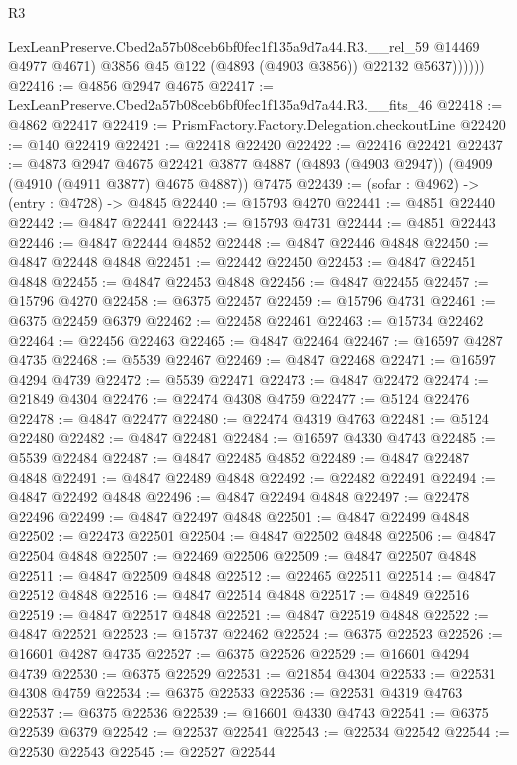 \begin{lexlean}{R3}
\begin{coremodule}
                LexLeanPreserve.Cbed2a57b08ceb6bf0fec1f135a9d7a44.R3.__rel_59 @14469 @4977 @4671)
                @3856
                @45
                @122
                (@4893 (@4903 @3856))
                @22132
                @5637))))))
@22416 := @4856 @2947 @4675
@22417 := LexLeanPreserve.Cbed2a57b08ceb6bf0fec1f135a9d7a44.R3.__fits_46
@22418 := @4862 @22417
@22419 := PrismFactory.Factory.Delegation.checkoutLine
@22420 := @140 @22419
@22421 := @22418 @22420
@22422 := @22416 @22421
@22437 := @4873
    @2947
    @4675
    @22421
    @3877
    @4887
    (@4893 (@4903 @2947))
    (@4909 (@4910 (@4911 @3877) @4675 @4887))
    @7475
@22439 := (sofar : @4962) -> (entry : @4728) -> @4845
@22440 := @15793 @4270
@22441 := @4851 @22440
@22442 := @4847 @22441
@22443 := @15793 @4731
@22444 := @4851 @22443
@22446 := @4847 @22444 @4852
@22448 := @4847 @22446 @4848
@22450 := @4847 @22448 @4848
@22451 := @22442 @22450
@22453 := @4847 @22451 @4848
@22455 := @4847 @22453 @4848
@22456 := @4847 @22455
@22457 := @15796 @4270
@22458 := @6375 @22457
@22459 := @15796 @4731
@22461 := @6375 @22459 @6379
@22462 := @22458 @22461
@22463 := @15734 @22462
@22464 := @22456 @22463
@22465 := @4847 @22464
@22467 := @16597 @4287 @4735
@22468 := @5539 @22467
@22469 := @4847 @22468
@22471 := @16597 @4294 @4739
@22472 := @5539 @22471
@22473 := @4847 @22472
@22474 := @21849 @4304
@22476 := @22474 @4308 @4759
@22477 := @5124 @22476
@22478 := @4847 @22477
@22480 := @22474 @4319 @4763
@22481 := @5124 @22480
@22482 := @4847 @22481
@22484 := @16597 @4330 @4743
@22485 := @5539 @22484
@22487 := @4847 @22485 @4852
@22489 := @4847 @22487 @4848
@22491 := @4847 @22489 @4848
@22492 := @22482 @22491
@22494 := @4847 @22492 @4848
@22496 := @4847 @22494 @4848
@22497 := @22478 @22496
@22499 := @4847 @22497 @4848
@22501 := @4847 @22499 @4848
@22502 := @22473 @22501
@22504 := @4847 @22502 @4848
@22506 := @4847 @22504 @4848
@22507 := @22469 @22506
@22509 := @4847 @22507 @4848
@22511 := @4847 @22509 @4848
@22512 := @22465 @22511
@22514 := @4847 @22512 @4848
@22516 := @4847 @22514 @4848
@22517 := @4849 @22516
@22519 := @4847 @22517 @4848
@22521 := @4847 @22519 @4848
@22522 := @4847 @22521
@22523 := @15737 @22462
@22524 := @6375 @22523
@22526 := @16601 @4287 @4735
@22527 := @6375 @22526
@22529 := @16601 @4294 @4739
@22530 := @6375 @22529
@22531 := @21854 @4304
@22533 := @22531 @4308 @4759
@22534 := @6375 @22533
@22536 := @22531 @4319 @4763
@22537 := @6375 @22536
@22539 := @16601 @4330 @4743
@22541 := @6375 @22539 @6379
@22542 := @22537 @22541
@22543 := @22534 @22542
@22544 := @22530 @22543
@22545 := @22527 @22544

\end{coremodule}
\end{lexlean}
